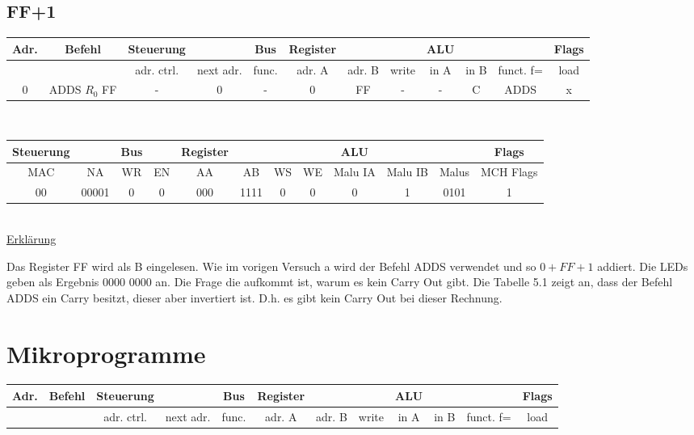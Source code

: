 \documentclass[paper=a4, fontsize=11pt]{scrartcl}
\numberwithin{equation}{section}
\numberwithin{figure}{section}
\numberwithin{table}{section}
\begin{document}

\subsection{FF+1}

\begin{tabular}{|c|c|cc|c|ccc|ccc|c|}
\hline
Adr. & Befehl &Steuerung & & Bus & Register & & & ALU & & & Flags \\
\hline
& & adr. ctrl. & next adr. & func. & adr. A & adr. B & write & in A & in B & funct. f= & load \\
\hline
0 & ADDS $R_{0}$ FF & - & 0 & - & 0 & FF & - & - & C & ADDS & x  \\
\hline
\end{tabular} \\

\begin{tabular}{|cc|cc|cccc|ccc|c|}
\hline
Steuerung & & Bus & & Register & & & & ALU & & & Flags \\
\hline
MAC & NA & WR & EN & AA & AB & WS & WE & Malu IA & Malu IB & Malus & MCH Flags \\
\hline
00 & 00001 & 0 & 0 & 000 & 1111 & 0 & 0 & 0 & 1 & 0101 & 1\\
\hline
\end{tabular} \\

\underline{Erklärung}

Das Register FF wird als B eingelesen. Wie im vorigen Versuch a wird der Befehl ADDS verwendet und so $0 + FF+ 1$ addiert. Die LEDs geben als Ergebnis 0000 0000 an. Die Frage die aufkommt ist, warum es kein Carry Out gibt. Die Tabelle 5.1 zeigt an, dass der Befehl ADDS ein Carry besitzt, dieser aber invertiert ist. D.h. es gibt kein Carry Out bei dieser Rechnung.


\newpage

\section{Mikroprogramme}

\begin{tabular}{|c|c|cc|c|ccc|ccc|c|}
\hline
Adr. & Befehl &Steuerung & & Bus & Register & & & ALU & & & Flags \\
\hline
& & adr. ctrl. & next adr. & func. & adr. A & adr. B & write & in A & in B & funct. f= & load \\
\hline
\end{tabular} \\
\end{document}
